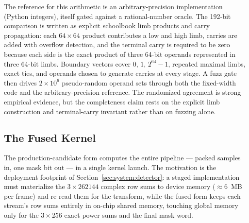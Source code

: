 The reference for this arithmetic is an arbitrary-precision implementation (Python integers), itself gated against a rational-number oracle.  The 192-bit comparison is written as explicit schoolbook limb products and carry propagation: each $64\times64$ product contributes a low and high limb, carries are added with overflow detection, and the terminal carry is required to be zero because each side is the exact product of three 64-bit operands represented in three 64-bit limbs.  Boundary vectors cover $0$, $1$, $2^{64}-1$, repeated maximal limbs, exact ties, and operands chosen to generate carries at every stage.  A fuzz gate then drives $2 \times 10^6$ pseudo-random operand sets through both the fixed-width code and the arbitrary-precision reference.  The randomized agreement is strong empirical evidence, but the completeness claim rests on the explicit limb construction and terminal-carry invariant rather than on fuzzing alone.

\subsection{The Fused Kernel}
\label{sec:impl:fused}
The production-candidate form computes the entire pipeline --- packed samples in, one mask bit out --- in a single kernel launch. The motivation is the deployment footprint of Section~\ref{sec:system:detector}: a staged implementation must materialize the $3 \times 262144$ complex row sums to device memory ($\approx 6$~MB per frame) and re-read them for the transform, while the fused form keeps each stream's row sums entirely in on-chip shared memory, touching global memory only for the $3 \times 256$ exact power sums and the final mask word.

